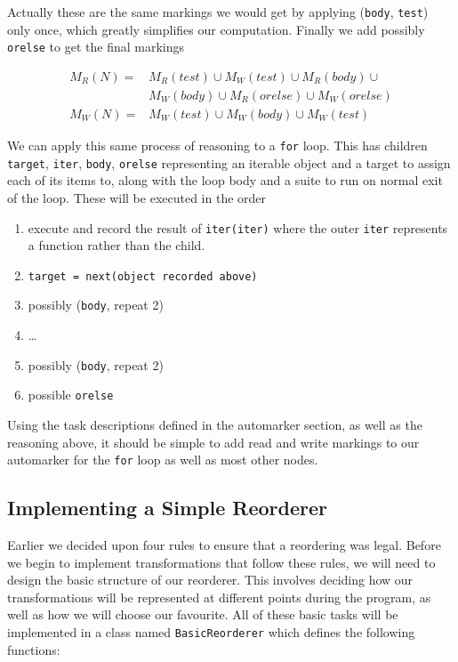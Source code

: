 \documentclass[twoside,a4paper]{report}
\begin{document}
Actually these are the same markings we would get by applying (\texttt{body}, \texttt{test}) only once, which greatly simplifies our computation. Finally we
add possibly \texttt{orelse} to get the final markings

\begin{align*}
M_R(N) =& M_R(test) \cup M_W(test) \cup M_R(body) \cup \\
        & M_W(body) \cup M_R(orelse) \cup M_W(orelse) \\
M_W(N) =& M_W(test) \cup M_W(body) \cup M_W(test)
\end{align*}

We can apply this same process of reasoning to a \texttt{for} loop. This has children \texttt{target}, \texttt{iter}, \texttt{body}, \texttt{orelse}
representing an iterable object and a target to assign each of its items to, along with the loop body and a suite to run on normal exit of the loop.
These will be executed in the order

\begin{enumerate}
\item execute and record the result of \texttt{iter(iter)} where the outer \texttt{iter} represents a function rather than the child.
\item \texttt{target = next(object recorded above)}
\item possibly (\texttt{body}, repeat 2)
\item \ldots
\item possibly (\texttt{body}, repeat 2)
\item possible \texttt{orelse}
\end{enumerate}

Using the task descriptions defined in the automarker section, as well as the reasoning above, it should be simple to add read and write markings to
our automarker for the \texttt{for} loop as well as most other nodes.

\subsection{Implementing a Simple Reorderer}

Earlier we decided upon four rules to ensure that a reordering was legal. Before we begin to implement transformations that follow these rules, we
will need to design the basic structure of our reorderer. This involves deciding how our transformations will be represented at different points
during the program, as well as how we will choose our favourite. All of these basic tasks will be implemented in a class named \texttt{BasicReorderer}
which defines the following functions:
\end{document}
